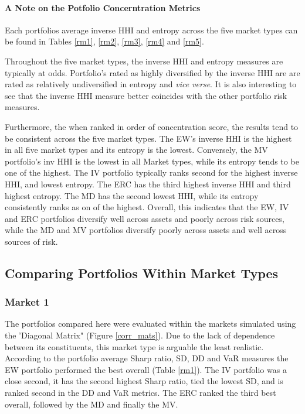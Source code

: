 \documentclass[11pt,preprint, authoryear]{elsarticle}
\numberwithin{equation}{section}
\numberwithin{figure}{section}
\numberwithin{table}{section}
\begin{document}
\hypertarget{a-note-on-the-potfolio-concerntration-metrics}{%
\paragraph{A Note on the Potfolio Concerntration
Metrics}\label{a-note-on-the-potfolio-concerntration-metrics}}

Each portfolios average inverse HHI and entropy across the five market
types can be found in Tables \ref{rm1}, \ref{rm2}, \ref{rm3}, \ref{rm4}
and \ref{rm5}.

Throughout the five market types, the inverse HHI and entropy measures
are typically at odds. Portfolio's rated as highly diversified by the
inverse HHI are are rated as relatively undiversified in entropy and
\emph{vice verse}. It is also interesting to see that the inverse HHI
measure better coincides with the other portfolio risk measures.

Furthermore, the when ranked in order of concentration score, the
results tend to be consistent across the five market types. The EW's
inverse HHI is the highest in all five market types and its entropy is
the lowest. Conversely, the MV portfolio's inv HHI is the lowest in all
Market types, while its entropy tends to be one of the highest. The IV
portfolio typically ranks second for the highest inverse HHI, and lowest
entropy. The ERC has the third highest inverse HHI and third highest
entropy. The MD has the second lowest HHI, while its entropy
consistently ranks as on of the highest. Overall, this indicates that
the EW, IV and ERC portfolios diversify well across assets and poorly
across risk sources, while the MD and MV portfolios diversify poorly
across assets and well across sources of risk.

\hypertarget{comparing-portfolios-within-market-types}{%
\subsection{\texorpdfstring{Comparing Portfolios Within Market Types
\label{within-market}}{Comparing Portfolios Within Market Types }}\label{comparing-portfolios-within-market-types}}

\hypertarget{market-1}{%
\subsubsection{Market 1}\label{market-1}}

The portfolios compared here were evaluated within the markets simulated
using the 'Diagonal Matrix" (Figure \ref{corr_mats}). Due to the lack of
dependence between its constituents, this market type is arguable the
least realistic. According to the portfolio average Sharp ratio, SD, DD
and VaR measures the EW portfolio performed the best overall (Table
\ref{rm1}). The IV portfolio was a close second, it has the second
highest Sharp ratio, tied the lowest SD, and is ranked second in the DD
and VaR metrics. The ERC ranked the third best overall, followed by the
MD and finally the MV.
\end{document}
